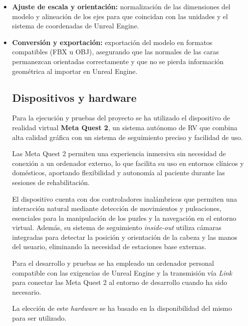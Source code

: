 \begin{itemize}
  \item \textbf{Ajuste de escala y orientación:} normalización de las dimensiones del modelo y alineación de los ejes para que coincidan con las unidades y el sistema de coordenadas de Unreal Engine.
  \item \textbf{Conversión y exportación:} exportación del modelo en formatos compatibles (FBX u OBJ), asegurando que las normales de las caras permanezcan orientadas correctamente y que no se pierda información geométrica al importar en Unreal Engine.

\subsection{Dispositivos y hardware}

Para la ejecución y pruebas del proyecto se ha utilizado el dispositivo de realidad virtual \textbf{Meta Quest 2}, un sistema autónomo de RV que combina alta calidad gráfica con un sistema de seguimiento preciso y facilidad de uso.

Las Meta Quest 2 permiten una experiencia inmersiva sin necesidad de conexión a un ordenador externo, lo que facilita su uso en entornos clínicos y domésticos, aportando flexibilidad y autonomía al paciente durante las sesiones de rehabilitación. 

El dispositivo cuenta con dos controladores inalámbricos que permiten una interacción natural mediante detección de movimientos y pulsaciones, esenciales para la manipulación de los puzles y la navegación en el entorno virtual. Además, su sistema de seguimiento \textit{inside-out} utiliza cámaras integradas para detectar la posición y orientación de la cabeza y las manos del usuario, eliminando la necesidad de estaciones base externas.

Para el desarrollo y pruebas se ha empleado un ordenador personal compatible con las exigencias de Unreal Engine y la transmisión vía \textit{Link} para conectar las Meta Quest 2 al entorno de desarrollo cuando ha sido necesario.

La elección de este \textit{hardware} se ha basado en la disponibilidad del mismo para ser utilizado.
  
\end{itemize}